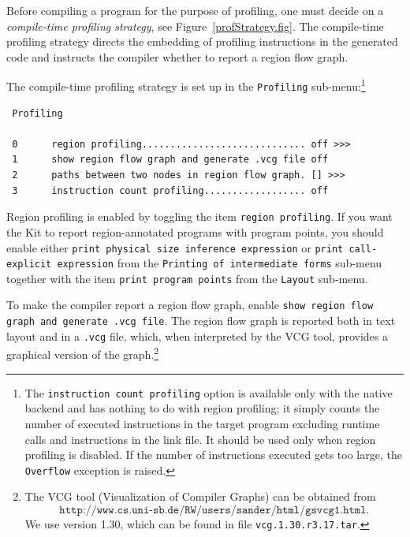 \documentclass[12pt]{book}
\begin{document}
Before compiling a program for the purpose of profiling, one must decide on a
%
{\em compile-time profiling strategy}, see
Figure~\ref{profStrategy.fig}.  The compile-time profiling strategy
directs the embedding of profiling instructions in the generated code
and instructs the compiler whether to report a region flow graph.

The compile-time profiling strategy is set up in the 
%
{\tt Profiling} sub-menu:\footnote{The   
  \texttt{instruction count profiling} option is available only with the
  native backend and has nothing to do with region profiling; it simply
  counts the number of executed instructions in the target program
  excluding runtime calls and instructions in the link file. It should be used
  only when region profiling is disabled. If the number of instructions
  executed gets too large, the {\tt Overflow} exception is raised.}

\begin{verbatim}
 Profiling

 0      region profiling............................. off >>>
 1      show region flow graph and generate .vcg file off
 2      paths between two nodes in region flow graph. [] >>>
 3      instruction count profiling.................. off
\end{verbatim}
\noindent
Region profiling is enabled by toggling the item
%
\mbox{{\tt region profiling}}. If you want the Kit to report
region-annotated programs with program points, you should enable
either 
%
{\tt print physical size inference expression} or
%
{\tt print call-explicit expression} from the {\tt Printing of
  intermediate forms} sub-menu together with the item 
%
{\tt print program points} from the {\tt Layout} sub-menu.

To make the compiler report a region flow graph, enable
%
{\tt show region flow graph and generate .vcg file}. The region flow
graph is reported both in text layout and in a {\tt .vcg} file, which,
when interpreted by the 
%
VCG tool, provides a graphical version of the graph.\footnote{The VCG
  tool (Visualization of Compiler Graphs) can be obtained from
  \[\texttt{http://www.cs.uni-sb.de/RW/users/sander/html/gsvcg1.html}.\]
  We use version 1.30, which can be found in file
  \texttt{vcg.1.30.r3.17.tar}.}
\end{document}
